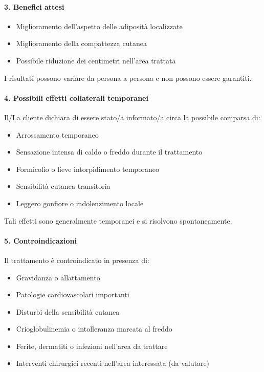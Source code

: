 \paragraph*{3. Benefici attesi}
\begin{itemize}
    \item Miglioramento dell’aspetto delle adiposità localizzate
    \item Miglioramento della compattezza cutanea
    \item Possibile riduzione dei centimetri nell’area trattata
\end{itemize}
I risultati possono variare da persona a persona e non possono essere garantiti.

\paragraph*{4. Possibili effetti collaterali temporanei}
Il/La cliente dichiara di essere stato/a informato/a circa la possibile comparsa di:
\begin{itemize}
    \item Arrossamento temporaneo
    \item Sensazione intensa di caldo o freddo durante il trattamento
    \item Formicolio o lieve intorpidimento temporaneo
    \item Sensibilità cutanea transitoria
    \item Leggero gonfiore o indolenzimento locale
\end{itemize}
Tali effetti sono generalmente temporanei e si risolvono spontaneamente.

\paragraph*{5. Controindicazioni}
Il trattamento è controindicato in presenza di:
\begin{itemize}
    \item Gravidanza o allattamento
    \item Patologie cardiovascolari importanti
    \item Disturbi della sensibilità cutanea
    \item Crioglobulinemia o intolleranza marcata al freddo
    \item Ferite, dermatiti o infezioni nell’area da trattare
    \item Interventi chirurgici recenti nell’area interessata (da valutare)
\end{itemize}

